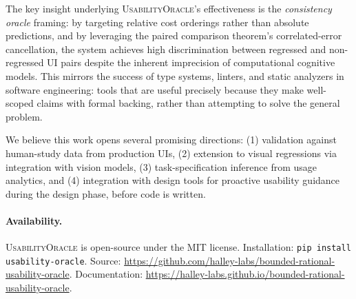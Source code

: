 \documentclass[11pt,twocolumn]{article}
\theoremstyle{definition}
\newcommand{\tool}{\textsc{UsabilityOracle}}
\begin{document}
The key insight underlying \tool{}'s effectiveness is the \emph{consistency oracle} framing: by targeting relative cost orderings rather than absolute predictions, and by leveraging the paired comparison theorem's correlated-error cancellation, the system achieves high discrimination between regressed and non-regressed UI pairs despite the inherent imprecision of computational cognitive models.
This mirrors the success of type systems, linters, and static analyzers in software engineering: tools that are useful precisely because they make well-scoped claims with formal backing, rather than attempting to solve the general problem.

We believe this work opens several promising directions: (1) validation against human-study data from production UIs, (2) extension to visual regressions via integration with vision models, (3) task-specification inference from usage analytics, and (4) integration with design tools for proactive usability guidance during the design phase, before code is written.

\paragraph{Availability.}
\tool{} is open-source under the MIT license.
Installation: \texttt{pip install usability-oracle}.
Source: \url{https://github.com/halley-labs/bounded-rational-usability-oracle}.
Documentation: \url{https://halley-labs.github.io/bounded-rational-usability-oracle}.
\end{document}
